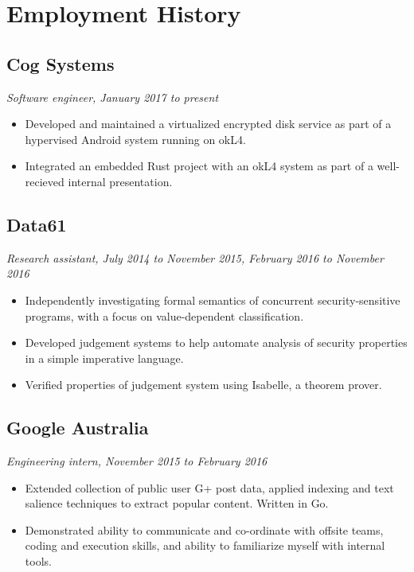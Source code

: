 \documentclass{article}
\begin{document}
\begin{multicols*}{2}
\begin{description}[leftmargin=12pt, itemsep=-2pt]
\end{description}

\section*{Employment History}

\subsection*{Cog Systems}
\textit{Software engineer, January 2017 to present}

\begin{itemize}[leftmargin=12pt, itemsep=-2pt, topsep=-4pt]
 \item {
  Developed and maintained a virtualized encrypted disk service as part of a hypervised Android system running on okL4.
 }
 \item {
  Integrated an embedded Rust project with an okL4 system as part of a well-recieved internal presentation.
 }
\end{itemize}

\subsection*{Data61}
\textit{Research assistant, July 2014 to November 2015, February 2016 to November 2016}

\begin{itemize}[leftmargin=12pt, itemsep=-2pt, topsep=-4pt]
 \item {
  Independently investigating formal semantics of concurrent security-sensitive programs, with a focus on value-dependent classification.
 }
 \item {
  Developed judgement systems to help automate analysis of security properties in a simple imperative language.
 }
 \item {
  Verified properties of judgement system using Isabelle, a theorem prover.
 }
\end{itemize}

\vfill

\subsection*{Google Australia}
\textit{Engineering intern, November 2015 to February 2016}

\begin{itemize}[leftmargin=12pt, itemsep=-2pt, topsep=-4pt]
 \item {
  Extended collection of public user G+ post data, applied indexing and text salience techniques to extract popular content. Written in Go.
 }
 \item {
  Demonstrated ability to communicate and co-ordinate with offsite teams, coding and execution skills, and ability to familiarize myself with internal tools.
 }
\end{itemize}


\end{multicols*}
\end{document}
